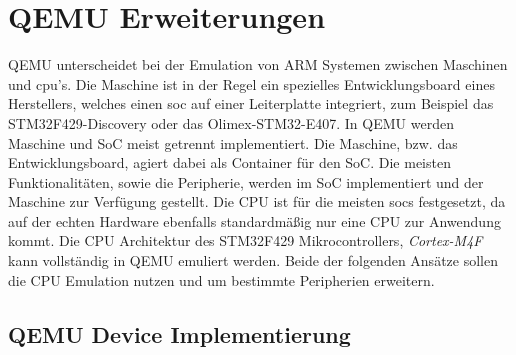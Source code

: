 \section{QEMU Erweiterungen}

QEMU unterscheidet bei der Emulation von ARM Systemen zwischen Maschinen und
\ac{cpu}'s.
Die Maschine ist in der Regel ein spezielles Entwicklungsboard eines
Herstellers, welches einen \ac{soc} auf einer Leiterplatte integriert, zum
Beispiel das STM32F429-Discovery\cite{Stm32F429DiscoveryBoard} oder das
Olimex-STM32-E407\cite{OlimexStm32E407Board}.
\newline
In QEMU werden Maschine und SoC meist getrennt implementiert.
Die Maschine, bzw. das Entwicklungsboard, agiert dabei als Container für den
SoC.
Die meisten Funktionalitäten, sowie die Peripherie, werden im SoC
implementiert und der Maschine zur Verfügung gestellt.
Die CPU ist für die meisten \acp{soc} festgesetzt, da auf der echten Hardware
ebenfalls standardmäßig nur eine CPU zur Anwendung kommt.
Die CPU Architektur des STM32F429 Mikrocontrollers, \textit{Cortex-M4F} kann
vollständig in QEMU emuliert werden.
Beide der folgenden Ansätze sollen die CPU Emulation nutzen und um bestimmte
Peripherien erweitern.

\subsection{QEMU Device Implementierung} \label{konzept-qemu-dev}

